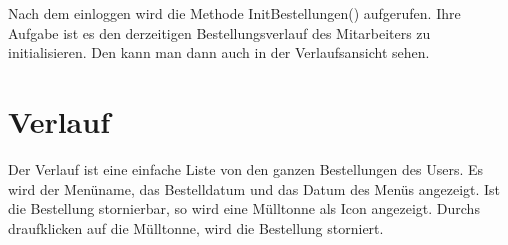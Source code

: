 Nach dem einloggen wird die Methode InitBestellungen() aufgerufen. Ihre Aufgabe ist es den derzeitigen Bestellungsverlauf des Mitarbeiters zu initialisieren.
Den kann man dann auch in der Verlaufsansicht sehen. 




\pagebreak

\section{Verlauf}

Der Verlauf ist eine einfache Liste von den ganzen Bestellungen des Users.
Es wird der Menüname, das Bestelldatum und das Datum des Menüs angezeigt.
Ist die Bestellung stornierbar, so wird eine Mülltonne als Icon angezeigt. 
Durchs draufklicken auf die Mülltonne, wird die Bestellung storniert.

